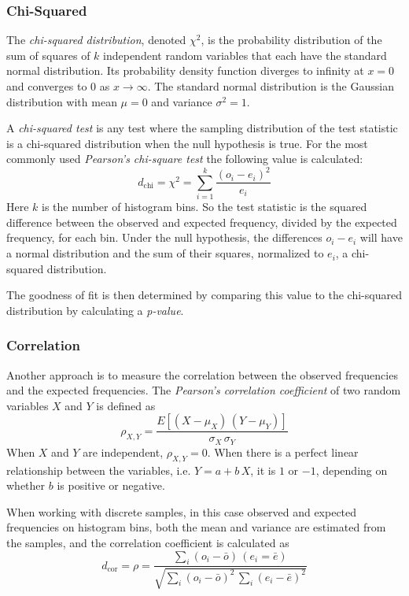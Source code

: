 \subsubsection{Chi-Squared}
The \emph{chi-squared distribution}, denoted $\chi^2$, is the probability distribution of the sum of squares of $k$ independent random variables that each have the standard normal distribution. Its probability density function diverges to infinity at $x = 0$ and converges to $0$ as $x \rightarrow \infty$. The standard normal distribution is the Gaussian distribution with mean $\mu = 0$ and variance $\sigma^2 = 1$.

A \emph{chi-squared test} is any test where the sampling distribution of the test statistic is a chi-squared distribution when the null hypothesis is true. For the most commonly used \emph{Pearson's chi-square test} the following value is calculated:
\begin{equation}
d_{\text{chi}} = \chi^2 = \sum_{i=1}^{k} \frac{(o_i - e_i)^2}{e_i} 
\end{equation}
Here $k$ is the number of histogram bins. So the test statistic is the squared difference between the observed and expected frequency, divided by the expected frequency, for each bin. Under the null hypothesis, the differences $o_i - e_i$ will have a normal distribution and the sum of their squares, normalized to $e_i$, a chi-squared distribution.

The goodness of fit is then determined by comparing this value to the chi-squared distribution by calculating a \emph{p-value}.

\subsubsection{Correlation}
Another approach is to measure the correlation between the observed frequencies and the expected frequencies. The \emph{Pearson's correlation coefficient} of two random variables $X$ and $Y$ is defined as
\begin{equation}
\rho_{X,Y} = \frac{E[(X - \mu_X) \, (Y - \mu_Y)]}{\sigma_X \, \sigma_Y}
\end{equation}
When $X$ and $Y$ are independent, $\rho_{X,Y} = 0$. When there is a perfect linear relationship between the variables, i.e. $Y = a + b \, X$, it is $1$ or $-1$, depending on whether $b$ is positive or negative.

When working with discrete samples, in this case observed and expected frequencies on histogram bins, both the mean and variance are estimated from the samples, and the correlation coefficient is calculated as
\begin{equation}
d_{\text{cor}} = \rho = \frac
{\sum_{i} (o_i - \bar{o}) \, (e_i = \bar{e})}
{\sqrt{ \sum_{i} (o_i - \bar{o})^2 \, \sum_{i} (e_i - \bar{e})^2 }}
\end{equation}
